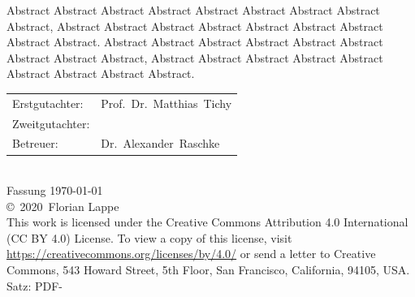 \documentclass[
a4paper,
numbers=noenddot,      %
bibliography=totoc,              %
BCOR=15mm,               %
leqno					%
]{scrbook}
\newcommand{\fullname}{Florian Lappe}
\newcommand{\jahr}{2020}
\newcommand{\gutachterA}{Prof.\ Dr.\ Matthias\ Tichy}
\newcommand{\gutachterB}{}
\newcommand{\betreuer}{Dr.\ Alexander\ Raschke}
\begin{document}
Abstract Abstract Abstract Abstract Abstract Abstract Abstract Abstract Abstract,
Abstract Abstract Abstract Abstract Abstract Abstract Abstract Abstract Abstract.
Abstract Abstract Abstract Abstract Abstract Abstract Abstract Abstract Abstract,
Abstract Abstract Abstract Abstract Abstract Abstract Abstract Abstract Abstract.

{
	\null
	\small
	\vfill
	\begin{center}
		\begin{tabular}{l l}
			Erstgutachter:  & \gutachterA \\
			Zweitgutachter: & \gutachterB \\
			Betreuer:       & \betreuer \\
		\end{tabular}\\[1cm]
		Fassung \today\\
		  \copyright~\jahr~\fullname\\[0.5em]
		This work is licensed under the Creative Commons Attribution 4.0 International (CC BY 4.0) License. To view a copy of this license, visit \href{https://creativecommons.org/licenses/by/4.0/}{https://creativecommons.org/licenses/by/4.0/} or send a letter to Creative Commons, 543 Howard Street, 5th Floor, San Francisco, California, 94105, USA. \\
		
		Satz: PDF-\LaTeXe
	\end{center}
}


\tableofcontents

\mainmatter %













\end{document}
